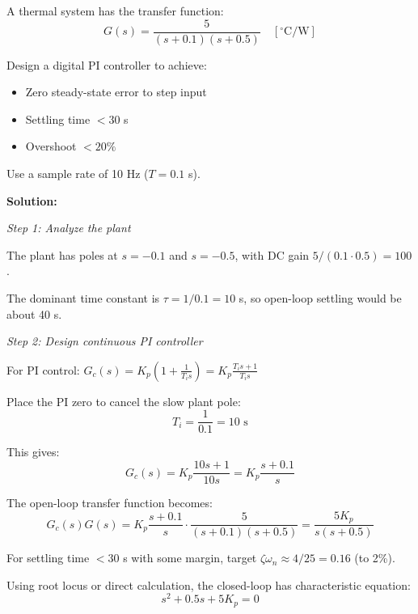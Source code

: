 \begin{example}
\label{ex:pid_temperature}

A thermal system has the transfer function:
\begin{equation}
G(s) = \frac{5}{(s+0.1)(s+0.5)} \quad [\text{$^\circ$C/W}]
\end{equation}

Design a digital PI controller to achieve:
\begin{itemize}
    \item Zero steady-state error to step input
    \item Settling time $< 30$ s
    \item Overshoot $< 20\%$
\end{itemize}

Use a sample rate of 10 Hz ($T = 0.1$ s).

\textbf{Solution:}

\textit{Step 1: Analyze the plant}

The plant has poles at $s = -0.1$ and $s = -0.5$, with DC gain $5/(0.1 \cdot 0.5) = 100$.

The dominant time constant is $\tau = 1/0.1 = 10$ s, so open-loop settling would be about 40 s.

\textit{Step 2: Design continuous PI controller}

For PI control: $G_c(s) = K_p(1 + \frac{1}{T_i s}) = K_p \frac{T_i s + 1}{T_i s}$

Place the PI zero to cancel the slow plant pole:
\begin{equation}
T_i = \frac{1}{0.1} = 10 \text{ s}
\end{equation}

This gives:
\begin{equation}
G_c(s) = K_p \frac{10s + 1}{10s} = K_p \frac{s + 0.1}{s}
\end{equation}

The open-loop transfer function becomes:
\begin{equation}
G_c(s)G(s) = K_p \frac{s + 0.1}{s} \cdot \frac{5}{(s+0.1)(s+0.5)} = \frac{5K_p}{s(s+0.5)}
\end{equation}

For settling time $< 30$ s with some margin, target $\zeta\omega_n \approx 4/25 = 0.16$ (to 2\%).

Using root locus or direct calculation, the closed-loop has characteristic equation:
\begin{equation}
s^2 + 0.5s + 5K_p = 0
\end{equation}


\end{example}
